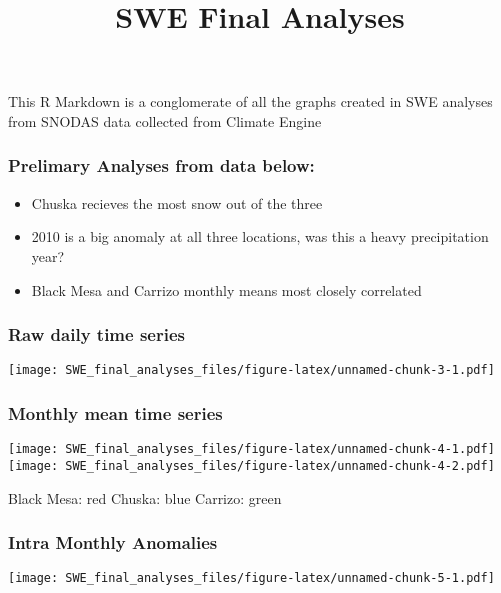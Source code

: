 \documentclass[]{article}
\title{SWE Final Analyses}
\author{}
\date{}
\providecommand{\tightlist}{%
  \setlength{\itemsep}{0pt}\setlength{\parskip}{0pt}}
\begin{document}
\maketitle

This R Markdown is a conglomerate of all the graphs created in SWE
analyses from SNODAS data collected from Climate Engine

\hypertarget{prelimary-analyses-from-data-below}{%
\subsubsection{Prelimary Analyses from data
below:}\label{prelimary-analyses-from-data-below}}

\begin{itemize}
\tightlist
\item
  Chuska recieves the most snow out of the three
\item
  2010 is a big anomaly at all three locations, was this a heavy
  precipitation year?
\item
  Black Mesa and Carrizo monthly means most closely correlated
\end{itemize}

\hypertarget{raw-daily-time-series}{%
\subsubsection{Raw daily time series}\label{raw-daily-time-series}}

\texttt{[image: SWE\_final\_analyses\_files/figure-latex/unnamed-chunk-3-1.pdf]}

\hypertarget{monthly-mean-time-series}{%
\subsubsection{Monthly mean time
series}\label{monthly-mean-time-series}}

\texttt{[image: SWE\_final\_analyses\_files/figure-latex/unnamed-chunk-4-1.pdf]}
\texttt{[image: SWE\_final\_analyses\_files/figure-latex/unnamed-chunk-4-2.pdf]}

Black Mesa: red Chuska: blue Carrizo: green

\hypertarget{intra-monthly-anomalies}{%
\subsubsection{Intra Monthly Anomalies}\label{intra-monthly-anomalies}}

\texttt{[image: SWE\_final\_analyses\_files/figure-latex/unnamed-chunk-5-1.pdf]}
\end{document}
